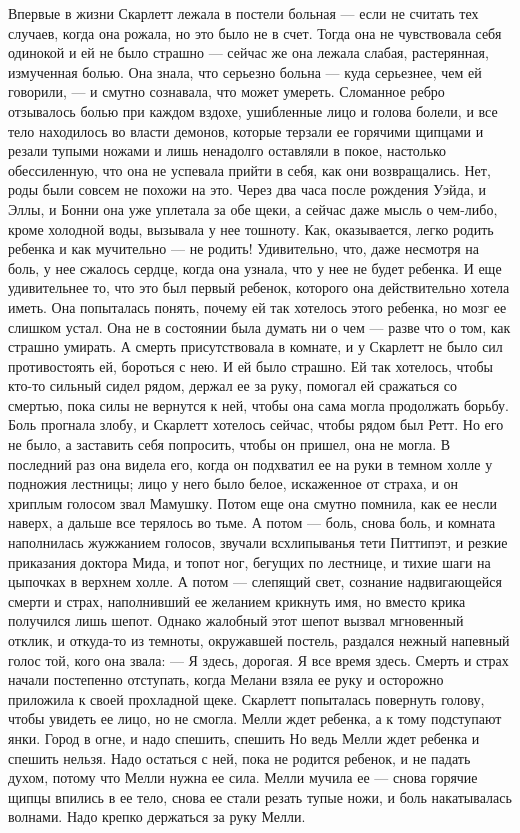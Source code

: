 Впервые в жизни Скарлетт лежала в постели больная — если не считать тех случаев, когда она рожала, но это было не в счет. Тогда она не чувствовала себя одинокой и ей не было страшно — сейчас же она лежала слабая, растерянная, измученная болью. Она знала, что серьезно больна — куда серьезнее, чем ей говорили, — и смутно сознавала, что может умереть. Сломанное ребро отзывалось болью при каждом вздохе, ушибленные лицо и голова болели, и все тело находилось во власти демонов, которые терзали ее горячими щипцами и резали тупыми ножами и лишь ненадолго оставляли в покое, настолько обессиленную, что она не успевала прийти в себя, как они возвращались. Нет, роды были совсем не похожи на это. Через два часа после рождения Уэйда, и Эллы, и Бонни она уже уплетала за обе щеки, а сейчас даже мысль о чем-либо, кроме холодной воды, вызывала у нее тошноту.
Как, оказывается, легко родить ребенка и как мучительно — не родить! Удивительно, что, даже несмотря на боль, у нее сжалось сердце, когда она узнала, что у нее не будет ребенка. И еще удивительнее то, что это был первый ребенок, которого она действительно хотела иметь. Она попыталась понять, почему ей так хотелось этого ребенка, но мозг ее слишком устал. Она не в состоянии была думать ни о чем — разве что о том, как страшно умирать. А смерть присутствовала в комнате, и у Скарлетт не было сил противостоять ей, бороться с нею. И ей было страшно. Ей так хотелось, чтобы кто-то сильный сидел рядом, держал ее за руку, помогал ей сражаться со смертью, пока силы не вернутся к ней, чтобы она сама могла продолжать борьбу.
Боль прогнала злобу, и Скарлетт хотелось сейчас, чтобы рядом был Ретт. Но его не было, а заставить себя попросить, чтобы он пришел, она не могла.
В последний раз она видела его, когда он подхватил ее на руки в темном холле у подножия лестницы; лицо у него было белое, искаженное от страха, и он хриплым голосом звал Мамушку. Потом еще она смутно помнила, как ее несли наверх, а дальше все терялось во тьме. А потом — боль, снова боль, и комната наполнилась жужжанием голосов, звучали всхлипыванья тети Питтипэт, и резкие приказания доктора Мида, и топот ног, бегущих по лестнице, и тихие шаги на цыпочках в верхнем холле. А потом — слепящий свет, сознание надвигающейся смерти и страх, наполнивший ее желанием крикнуть имя, но вместо крика получился лишь шепот.
Однако жалобный этот шепот вызвал мгновенный отклик, и откуда-то из темноты, окружавшей постель, раздался нежный напевный голос той, кого она звала:
— Я здесь, дорогая. Я все время здесь.
Смерть и страх начали постепенно отступать, когда Мелани взяла ее руку и осторожно приложила к своей прохладной щеке. Скарлетт попыталась повернуть голову, чтобы увидеть ее лицо, но не смогла. Мелли ждет ребенка, а к тому подступают янки. Город в огне, и надо спешить, спешить Но ведь Мелли ждет ребенка и спешить нельзя. Надо остаться с ней, пока не родится ребенок, и не падать духом, потому что Мелли нужна ее сила. Мелли мучила ее — снова горячие щипцы впились в ее тело, снова ее стали резать тупые ножи, и боль накатывалась волнами. Надо крепко держаться за руку Мелли.

